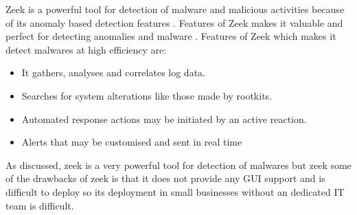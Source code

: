 Zeek is a powerful tool for detection of malware and malicious activities because of its anomaly based detection features \cite{Haas2020ZeekOsqueryHC}. Features of Zeek makes it valuable and perfect for detecting anomalies and malware . Features of Zeek which makes it detect malwares at high efficiency are:\\

\begin{itemize}
    \item It gathers, analyses and correlates log data. 
    \item Searches for system alterations like those made by rootkits. 
    \item Automated response actions may be initiated by an active reaction. 
    \item Alerts that may be customised and sent in real time \\
\end{itemize}

As discussed, zeek is a very powerful tool for detection of malwares but zeek some of the drawbacks of zeek is that it does not provide any GUI support and is difficult to deploy so its deployment in small businesses without an dedicated IT team is difficult. 
 